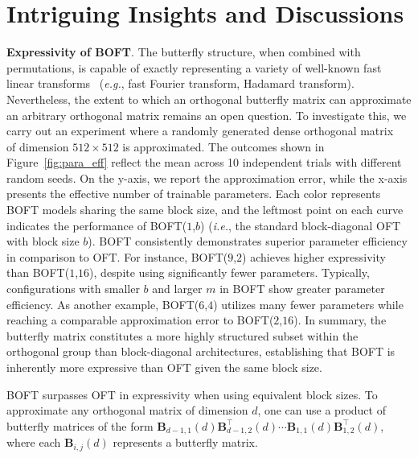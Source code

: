 \section{Intriguing Insights and Discussions}

\textbf{Expressivity of BOFT}. The butterfly structure, when combined with permutations, is capable of exactly representing a variety of well-known fast linear transforms~\cite{dao2019learning,dao2019kaleidoscope} (\emph{e.g.}, fast Fourier transform, Hadamard transform). Nevertheless, the extent to which an orthogonal butterfly matrix can approximate an arbitrary orthogonal matrix remains an open question. To investigate this, we carry out an experiment where a randomly generated dense orthogonal matrix~\cite{anderson1987generation} of dimension $512\times 512$ is approximated. The outcomes shown in Figure~\ref{fig:para_eff} reflect the mean across 10 independent trials with different random seeds. On the y-axis, we report the approximation error, while the x-axis presents the effective number of trainable parameters. Each color represents BOFT models sharing the same block size, and the leftmost point on each curve indicates the performance of BOFT($1$,$b$) (\emph{i.e.}, the standard block-diagonal OFT with block size $b$). BOFT consistently demonstrates superior parameter efficiency in comparison to OFT. For instance, BOFT($9$,$2$) achieves higher expressivity than BOFT($1$,$16$), despite using significantly fewer parameters. Typically, configurations with smaller $b$ and larger $m$ in BOFT show greater parameter efficiency. As another example, BOFT($6$,$4$) utilizes many fewer parameters while reaching a comparable approximation error to BOFT($2$,$16$). In summary, the butterfly matrix constitutes a more highly structured subset within the orthogonal group than block-diagonal architectures, establishing that BOFT is inherently more expressive than OFT given the same block size.

\begin{theorem}\label{thm:exp_boft}
    BOFT surpasses OFT in expressivity when using equivalent block sizes. To approximate any orthogonal matrix of dimension $d$, one can use a product of butterfly matrices of the form $\bm{B}_{d-1,1}(d)\bm{B}^\top_{d-1,2}(d)\cdots\bm{B}_{1,1}(d)\bm{B}^\top_{1,2}(d)$, where each $\bm{B}_{i,j}(d)$ represents a butterfly matrix.
\end{theorem}


